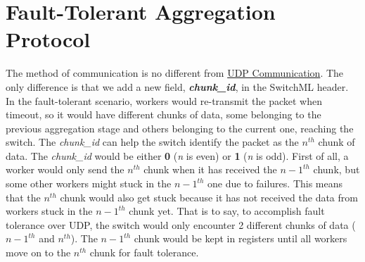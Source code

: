 \documentclass[a4paper,11pt]{article}
\begin{document}
\section{Fault-Tolerant Aggregation Protocol}
\label{ftap}
\label{sec:ftap}
The method of communication is no different from \hyperref[udpcmn]{UDP Communication}. The only difference is that we add a new field, \textbf{\textit{chunk\_id}}, in the SwitchML header. In the fault-tolerant scenario, workers would re-transmit the packet when timeout, so it would have different chunks of data, some belonging to the previous aggregation stage and others belonging to the current one, reaching the switch. The \textit{chunk\_id} can help the switch identify the packet as the ${n}^{th}$ chunk of data. The \textit{chunk\_id} would be either \textbf{0} (\textit{n} is even) or \textbf{1} (\textit{n} is odd). First of all, a worker would only send the ${n}^{th}$ chunk when it has received the ${n-1}^{th}$ chunk, but some other workers might stuck in the ${n-1}^{th}$ one due to failures. This means that the ${n}^{th}$ chunk would also get stuck because it has not received the data from workers stuck in the ${n-1}^{th}$ chunk yet. That is to say, to accomplish fault tolerance over UDP, the switch would only encounter 2 different chunks of data (${n-1}^{th}$ and ${n}^{th}$). The ${n-1}^{th}$ chunk would be kept in registers until all workers move on to the ${n}^{th}$ chunk for fault tolerance.
\end{document}
